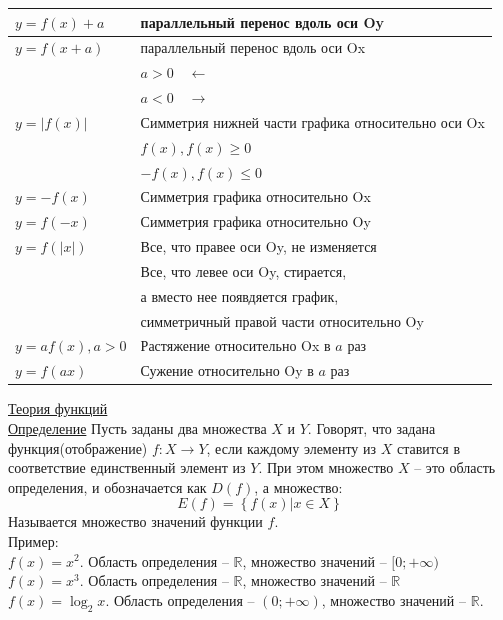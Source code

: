 \documentclass{article}
\begin{document}
\begin{center}
\begin{tabular}{| l | l |}
\hline
     \( y = f(x) + a\) &  параллельный перенос вдоль оси Oy \\ \hline
     \( y = f(x + a) \) & параллельный перенос вдоль оси Ox \\ 
      & \( a > 0 \quad \leftarrow \) \\
      & \( a < 0 \quad \rightarrow \) \\ \hline 
      \( y = |f(x)| \) & Симметрия нижней части графика относительно оси Ox \\
      & \( f(x), f(x) \geq 0\) \\
      & \( -f(x), f(x) \leq 0\) \\ \hline
      \(y = -f(x)\) & Симметрия графика относительно Ox \\ \hline
      \( y = f(-x) \) & Симметрия графика относительно Oy \\ \hline
      \( y = f(|x|) \) & Все, что правее оси Oy, не изменяется \\
      & Все, что левее оси Oy, стирается, \\
      & а вместо нее появдяется график, \\
      & симметричный правой части относительно Oy \\ \hline
      \( y = af(x), a > 0 \) & Растяжение относительно Ox в $a$ раз \\ \hline
      \( y = f(ax) \) & Сужение относительно Oy в $a$ раз \\ \hline
\end{tabular}
\end{center}
\underline{Теория функций}
\\
\underline{Определение} Пусть заданы два множества $X$ и $Y$. Говорят, что задана функция(отображение) $f: X \rightarrow Y$, если каждому элементу из $X$ ставится
в соответствие единственный элемент из $Y$. При этом множество $X$ --
это область определения, и обозначается как $D(f)$, а множество:
\[ E(f) = \left\{ f(x)| x \in X \right\} \]
Называется множество значений функции $f$.
\\
Пример: 
\\
$f(x) = x^2$. Область определения -- $\mathbb{R}$, множество значений -- $[0; +\infty)$
\\
$f(x) = x^3$. Область определения -- $\mathbb{R}$, множество значений -- $\mathbb{R}$
\\ $f(x) = \log_2 x$. Область определения -- $(0; +\infty)$, множество 
значений -- $\mathbb{R}$.
\end{document}
